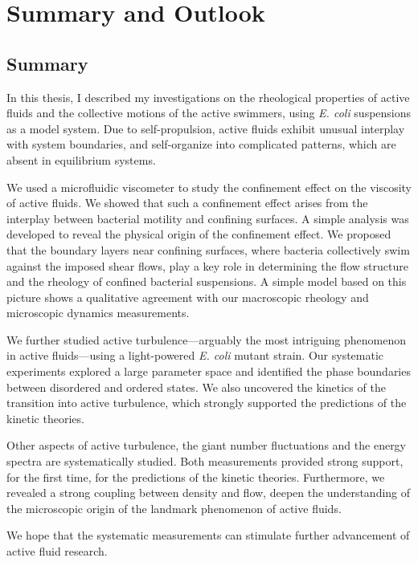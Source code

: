\chapter{Summary and Outlook}
\label{summary-and-outlook}
\section{Summary}

In this thesis, I described my investigations on the rheological properties of active fluids and the collective motions of the active swimmers, using \textit{E. coli} suspensions as a model system. Due to self-propulsion, active fluids exhibit unusual interplay with system boundaries, and self-organize into complicated patterns, which are absent in equilibrium systems.

We used a microfluidic viscometer to study the confinement effect on the viscosity of active fluids. We showed that such a confinement effect arises from the interplay between bacterial motility and confining surfaces. A simple analysis was developed to reveal the physical origin of the confinement effect. We proposed that the boundary layers near confining surfaces, where bacteria collectively swim against the imposed shear flows, play a key role in determining the flow structure and the rheology of confined bacterial suspensions. A simple model based on this picture shows a qualitative agreement with our macroscopic rheology and microscopic dynamics measurements.

We further studied active turbulence---arguably the most intriguing phenomenon in active fluids---using a light-powered \textit{E. coli} mutant strain. Our systematic experiments explored a large parameter space and identified the phase boundaries between disordered and ordered states. We also uncovered the kinetics of the transition into active turbulence, which strongly supported the predictions of the kinetic theories.

Other aspects of active turbulence, the giant number fluctuations and the energy spectra are systematically studied. Both measurements provided strong support, for the first time, for the predictions of the kinetic theories. Furthermore, we revealed a strong coupling between density and flow, deepen the understanding of the microscopic origin of the landmark phenomenon of active fluids.

We hope that the systematic measurements can stimulate further advancement of active fluid research.

